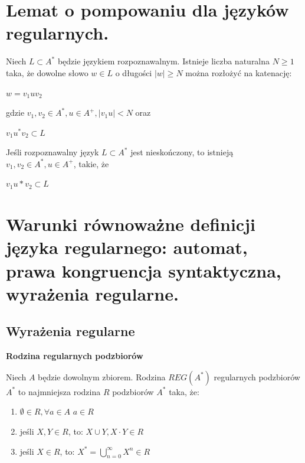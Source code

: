 \documentclass[12pt]{article}
\begin{document}
    \section{Lemat o pompowaniu dla języków regularnych.}
    \begin{definition}
    Niech $L \subset A^*$ będzie językiem rozpoznawalnym. Istnieje liczba naturalna $N \geq 1$ taka, że dowolne słowo $w \in L$ o długości $|w| \geq N$ można rozłożyć na katenację:
    \begin{center}
    $w = v_1uv_2$
    \end{center}
    gdzie $v_1, v_2 \in A^*, u \in A^+, |v_1u| < N$ oraz
    \begin{center}
    $v_1u^*v_2 \subset L$
    \end{center}
    \end{definition}
    
    \begin{definition}
    Jeśli rozpoznawalny język $L \subset A^*$ jest nieskończony, to istnieją
    $v_1, v_2 \in A^*, u \in A^+$, takie, że
    \begin{center}
	$v_1u*v_2 \subset L$
    \end{center}
    \end{definition}
    
    \newpage
    \section{Warunki równoważne definicji języka regularnego: automat, prawa kongruencja syntaktyczna, wyrażenia regularne.}
        \subsection{Wyrażenia regularne}
        
        \begin{definition}
            \textbf{Rodzina regularnych podzbiorów}

            Niech $A$ będzie dowolnym zbiorem. Rodzina $REG(A^*)$ regularnych podzbiorów
            $A^*$ to najmniejsza rodzina $R$ podzbiorów $A^*$ taka, że:

            \begin{enumerate}
                \item $\emptyset \in R, \forall a \in A$ ${a} \in R$
                \item jeśli $X, Y \in R$, to: $X \cup Y, X \cdot Y \in R$
                \item jeśli $X \in R$, to: $X^* = \bigcup\limits_{n = 0}^{\infty} X^n \in R$
            \end{enumerate}
        \end{definition}
\end{document}
